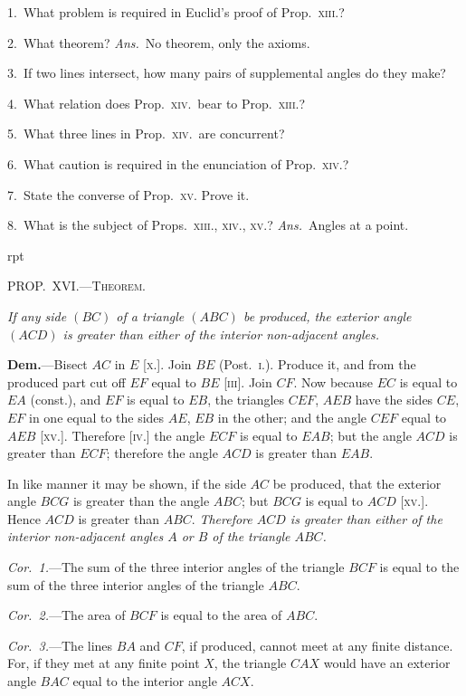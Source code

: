 \documentclass[oneside]{book}
\newcommand\mypropflot[5]{
\vspace{0.5\baselineskip}
\bigskip\Needspace*{4\baselineskip}
\setcounter{wrapwidth}{#3}
\begin{wrapfigure}[#4]{r}{\value{wrapwidth}pt}
\begin{center}
\vspace{-0.3in}
\end{center}
\end{wrapfigure}
\hspace{1.5\parindent}\textsc{#1}\par\medskip
\indent\emph{#2}\par\medskip
}
\begin{document}
\begin{footnotesize}
1.~What problem is required in Euclid's proof of Prop.~\textsc{xiii}.?

2.~What theorem? \textit{Ans.}\ No theorem, only the axioms.

3.~If two lines intersect, how many pairs of supplemental
angles do they make?


4.~What relation does Prop.~\textsc{xiv}.~bear to Prop.~\textsc{xiii}.?

5.~What three lines in Prop.~\textsc{xiv}.\ are concurrent?

6.~What caution is required in the enunciation of Prop.~\textsc{xiv}.?

7.~State the converse of Prop.~\textsc{xv}. Prove it.

8.~What is the subject of Props.~\textsc{xiii., xiv., xv.}? \textit{Ans.}\ Angles
at a point.
\par\end{footnotesize}


\mypropflot{PROP\@.~XVI\@.---Theorem.}{If any side $(BC)$ of a triangle $(ABC)$ be produced, the
exterior angle $(ACD)$ is greater than either of the interior\index{Angle!interior}
non-adjacent angles.}{110}{11}{f031}

\textbf{Dem.}---Bisect $AC$ in $E$ [\textsc{x}.]. Join $BE$ (Post.~\textsc{i}.).
Produce it, and from the produced
part cut off $EF$ equal to $BE$ [\textsc{iii}].
Join $CF$. Now because $EC$ is equal
to $EA$ (const.), and $EF$ is equal
to $EB$, the triangles $CEF$, $AEB$
have the sides $CE$, $EF$ in one
equal to the sides $AE$, $EB$ in the
other; and the angle $CEF$ equal
to $AEB$ [\textsc{xv}.]. Therefore [\textsc{iv}.]
the angle $ECF$ is equal to $EAB$;
but the angle $ACD$ is greater
than $ECF$; therefore the angle
$ACD$ is greater than $EAB$.

In like manner it may be shown, if the side $AC$ be
produced, that the exterior angle $BCG$ is greater than
the angle $ABC$; but $BCG$ is equal to $ACD$ [\textsc{xv}.]. Hence
$ACD$ is greater than $ABC$. \emph{Therefore $ACD$ is greater
than either of the interior non-adjacent angles $A$ or $B$ of
the triangle $ABC$.}

\textit{Cor.~1.}---The sum of the three interior angles of the
triangle $BCF$ is equal to the sum of the three interior
angles of the triangle $ABC$.

\textit{Cor.~2.}---The area of $BCF$ is equal to the area of
$ABC$.


\textit{Cor.~3.}---The lines $BA$ and $CF$, if produced, cannot
meet at any finite distance. For, if they met at any
finite point $X$, the triangle $CAX$ would have an exterior
angle $BAC$ equal to the interior angle $ACX$.
\end{document}
